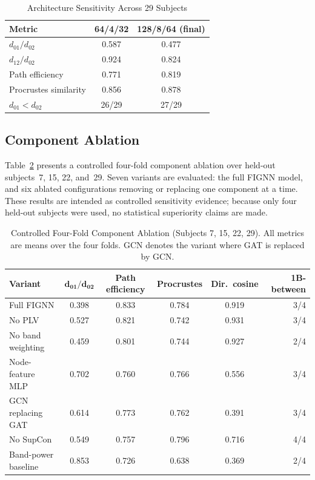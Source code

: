 \documentclass{ieeeaccess}
\begin{document}
\begin{table}[!t]
  \caption{Architecture Sensitivity Across 29 Subjects}
  \label{tab:arch}
  \centering
  \begin{tabular}{lcc}
    \toprule
    \textbf{Metric} & \textbf{64/4/32} & \textbf{128/8/64 (final)} \\
    \midrule
    $d_{01}/d_{02}$        & 0.587 & 0.477 \\
    $d_{12}/d_{02}$        & 0.924 & 0.824 \\
    Path efficiency        & 0.771 & 0.819 \\
    Procrustes similarity  & 0.856 & 0.878 \\
    $d_{01}<d_{02}$        & 26/29 & 27/29 \\
    \bottomrule
  \end{tabular}
\end{table}

\subsection{Component Ablation}

Table~\ref{tab:ablation} presents a controlled four-fold component ablation
over held-out subjects~7, 15, 22, and~29. Seven variants are evaluated:
the full FIGNN model, and six ablated configurations removing or replacing
one component at a time. These results are intended as controlled sensitivity
evidence; because only four held-out subjects were used, no statistical
superiority claims are made.

\begin{table}[!t]
  \caption{Controlled Four-Fold Component Ablation (Subjects 7, 15, 22, 29).
           All metrics are means over the four folds.
           GCN denotes the variant where GAT is replaced by GCN.}
  \label{tab:ablation}
  \centering
  \begin{tabular}{lccccr}
    \toprule
    \textbf{Variant}
      & $\mathbf{d_{01}/d_{02}}$
      & \textbf{Path efficiency}
      & \textbf{Procrustes}
      & \textbf{Dir.\ cosine}
      & \textbf{1B-between} \\
    \midrule
    Full FIGNN             & 0.398 & 0.833 & 0.784 & 0.919 & 3/4 \\
    No PLV                 & 0.527 & 0.821 & 0.742 & 0.931 & 3/4 \\
    No band weighting      & 0.459 & 0.801 & 0.744 & 0.927 & 2/4 \\
    Node-feature MLP       & 0.702 & 0.760 & 0.766 & 0.556 & 3/4 \\
    GCN replacing GAT      & 0.614 & 0.773 & 0.762 & 0.391 & 3/4 \\
    No SupCon              & 0.549 & 0.757 & 0.796 & 0.716 & 4/4 \\
    Band-power baseline    & 0.853 & 0.726 & 0.638 & 0.369 & 2/4 \\
    \bottomrule
  \end{tabular}
\end{table}
\end{document}
